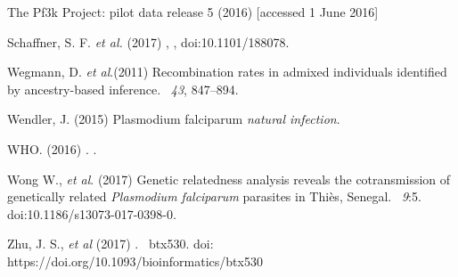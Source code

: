 \documentclass{article}
\begin{document}
\begin{thebibliography}{}
The Pf3k Project: pilot data release 5 (2016)
 [accessed 1 June 2016]

Schaffner, S. F. {\em et al.} (2017)
,
, doi:10.1101/188078.

Wegmann, D. {\em et al}.(2011)
\newblock Recombination rates in admixed individuals identified by ancestry-based inference.
~{\em 43\/}, 847--894.

Wendler, J. (2015)
 {P}lasmodium falciparum {\em natural infection}.

WHO. (2016)
.
.

Wong W., {\em et al}. (2017)
\newblock Genetic relatedness analysis reveals the cotransmission of genetically related {\it Plasmodium falciparum} parasites in Thiès, Senegal.
~{\em 9}:5. doi:10.1186/s13073-017-0398-0.

Zhu, J. S., {\em et al} (2017)
.
~{\em \/}btx530. doi: https://doi.org/10.1093/bioinformatics/btx530

\end{thebibliography}
\end{document}
